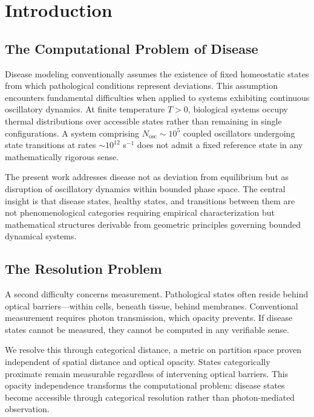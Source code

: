 \documentclass[10pt,twocolumn]{article}
\theoremstyle{plain}
\theoremstyle{definition}
\theoremstyle{remark}
\begin{document}
\section{Introduction}
\label{sec:introduction}

\subsection{The Computational Problem of Disease}

Disease modeling conventionally assumes the existence of fixed homeostatic states from which pathological conditions represent deviations. This assumption encounters fundamental difficulties when applied to systems exhibiting continuous oscillatory dynamics. At finite temperature $T > 0$, biological systems occupy thermal distributions over accessible states rather than remaining in single configurations. A system comprising $N_{\mathrm{osc}} \sim 10^5$ coupled oscillators undergoing state transitions at rates $\sim 10^{12}$ s$^{-1}$ does not admit a fixed reference state in any mathematically rigorous sense.

The present work addresses disease not as deviation from equilibrium but as disruption of oscillatory dynamics within bounded phase space. The central insight is that disease states, healthy states, and transitions between them are not phenomenological categories requiring empirical characterization but mathematical structures derivable from geometric principles governing bounded dynamical systems.

\subsection{The Resolution Problem}

A second difficulty concerns measurement. Pathological states often reside behind optical barriers---within cells, beneath tissue, behind membranes. Conventional measurement requires photon transmission, which opacity prevents. If disease states cannot be measured, they cannot be computed in any verifiable sense.

We resolve this through categorical distance, a metric on partition space proven independent of spatial distance and optical opacity. States categorically proximate remain measurable regardless of intervening optical barriers. This opacity independence transforms the computational problem: disease states become accessible through categorical resolution rather than photon-mediated observation.
\end{document}
